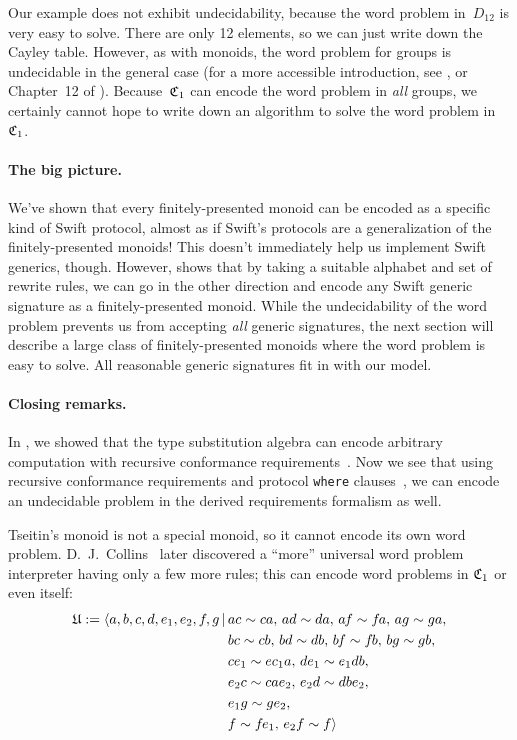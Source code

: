 \documentclass[../generics]{subfiles}
\begin{document}
Our example does not exhibit undecidability, because the word problem in~$D_{12}$ is very easy to solve. There are only 12 elements, so we can just write down the Cayley table. However, as with monoids, the word problem for groups is undecidable in the general case \cite{undecidablegroup} (for a more accessible introduction, see \cite{undecidablegroup2}, or Chapter~12 of \cite{rotman}). Because~$\mathfrak{C}_1$ can encode the word problem in \emph{all} groups, we certainly cannot hope to write down an algorithm to solve the word problem in~$\mathfrak{C}_1$.

\paragraph{The big picture.} We've shown that every finitely-presented monoid can be encoded as a specific kind of Swift protocol, almost as if Swift's protocols are a generalization of the finitely-presented monoids! This doesn't immediately help us implement Swift generics, though. However,  shows that by taking a suitable alphabet and set of rewrite rules, we can go in the other direction and encode any Swift generic signature as a finitely-presented monoid. While the undecidability of the word problem prevents us from accepting \emph{all} generic signatures, the next section will describe a large class of finitely-presented monoids where the word problem is easy to solve. All reasonable generic signatures fit in with our model.

\paragraph{Closing remarks.} In , we showed that the type substitution algebra can encode arbitrary computation with recursive conformance requirements~\cite{se0157}. Now we see that using recursive conformance requirements and protocol \texttt{where} clauses~\cite{se0142}, we can encode an undecidable problem in the derived requirements formalism as well.

Tseitin's monoid is not a special monoid, so it cannot encode its own word problem. D.~J.~Collins~\cite{universalsemigroup} later discovered a ``more'' universal word problem interpreter having only a few more rules; this can encode word problems in $\mathfrak{C}_1$ or even itself:
\begin{align*}
\mathfrak{U} := \langle  a,b,c,d,e_1,e_2,f\hspace{-0.08em} ,g\,|\,&ac\sim ca,\,ad\sim da,\,a\hspace{-0.08em} f\sim f\hspace{-0.08em} a,\,ag\sim ga,\\
&bc\sim cb,\, bd\sim db,\, b\hspace{-0.08em} f\sim f\hspace{-0.08em} b,\, bg\sim gb,\\
&ce_1\sim ec_1a,\, de_1\sim e_1db,\\
&e_2c\sim cae_2,\, e_2d\sim dbe_2,\\
&e_1g\sim ge_2,\\
&f\sim f\hspace{-0.08em} e_1,\, e_2f\sim f\rangle
\end{align*}
\end{document}
